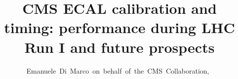\documentclass[journal]{IEEEtran}
\begin{document}
%
\title{CMS ECAL calibration and timing: performance during LHC Run I and future prospects}
%
%
%

\author{Emanuele~Di~Marco~on~behalf~of~the~CMS~Collaboration,~}

% 
%



% 




\end{document}
